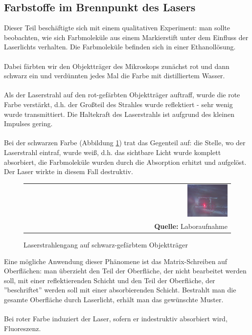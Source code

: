 \documentclass[a4paper,titlepage]{scrartcl}
\numberwithin{equation}{section}
\begin{document}
\subsection{Farbstoffe im Brennpunkt des Lasers}
Dieser Teil beschäftigte sich mit einem qualitativen Experiment: man sollte beobachten, wie sich Farbmoleküle aus einem Markierstift unter dem Einfluss der Laserlichts verhalten. Die Farbmoleküle befinden sich in einer Ethanollösung.\\ \\
Dabei färbten wir den Objektträger des Mikroskops zunächst rot und dann schwarz ein und verdünnten jedes Mal die Farbe mit distilliertem Wasser.\\ \\
Als der Laserstrahl auf den rot-gefärbten Objektträger auftraff, wurde die rote Farbe verstärkt, d.h. der Großteil des Strahles wurde reflektiert - sehr wenig wurde transmittiert. Die Haltekraft des Laserstrahls ist aufgrund des kleinen Impulses gering.\\ \\
Bei der schwarzen Farbe (Abbildung \ref{fig:laboraufnahme2}) trat das Gegenteil auf: die Stelle, wo der Laserstrahl eintraf, wurde weiß, d.h. das sichtbare Licht wurde komplett absorbiert, die Farbmoleküle wurden durch die Absorption erhitzt und aufgelöst. Der Laser wirkte in diesem Fall destruktiv.
\begin{figure}[H]
	\centering
	\begin{tabular}{@{}r@{}}
		\includegraphics[width=0.2\textwidth]{images/aufgabe3-7-schwarz.jpg}\\
		\footnotesize\sffamily\textbf{Quelle:} Laboraufnahme
	\end{tabular}
	\caption{Laserstrahlengang auf schwarz-gefärbtem Objektträger}
    \label{fig:laboraufnahme2}
\end{figure}
Eine mögliche Anwendung dieser Phänomene ist das Matrix-Schreiben auf Oberflächen: man überzieht den Teil der Oberfläche, der nicht bearbeitet werden soll, mit einer reflektierenden Schicht und den Teil der Oberfläche, der ''beschriftet'' werden soll mit einer absorbierenden Schicht. Bestrahlt man die gesamte Oberfläche durch Laserlicht, erhält man das gewünschte Muster.\\ \\
Bei roter Farbe induziert der Laser, sofern er indestruktiv absorbiert wird, Fluoreszenz.
\end{document}
